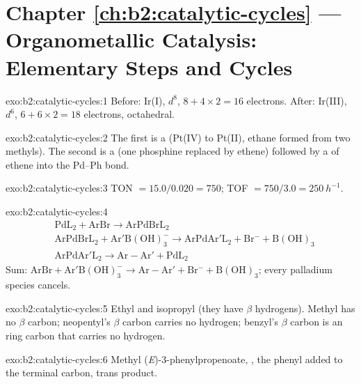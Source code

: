\section*{Chapter \ref{ch:b2:catalytic-cycles} --- Organometallic Catalysis: Elementary Steps and Cycles}

\begin{solution}{exo:b2:catalytic-cycles:1}
Before: Ir(I), $d^8$, $8 + 4 \times 2 = 16$ electrons. After: Ir(III), $d^6$, $6 + 6 \times 2 = 18$
electrons, octahedral.
\end{solution}

\begin{solution}{exo:b2:catalytic-cycles:2}
The first is a  (Pt(IV) to Pt(II), ethane formed from two methyls).
The second is a  (one phosphine replaced by ethene) followed by a
 of ethene into the Pd--Ph bond.
\end{solution}

\begin{solution}{exo:b2:catalytic-cycles:3}
TON $= 15.0/0.020 = 750$; TOF $= 750/3.0 = \qty{250}{h^{-1}}$.
\end{solution}

\begin{solution}{exo:b2:catalytic-cycles:4}
\begin{align*}
  &\mathrm{PdL_2 + ArBr \to ArPdBrL_2}\\
  &\mathrm{ArPdBrL_2 + Ar'B(OH)_3^- \to ArPdAr'L_2 + Br^- + B(OH)_3}\\
  &\mathrm{ArPdAr'L_2 \to Ar{-}Ar' + PdL_2}
\end{align*}
Sum: $\mathrm{ArBr + Ar'B(OH)_3^- \to Ar{-}Ar' + Br^- + B(OH)_3}$; every palladium species
cancels.
\end{solution}

\begin{solution}{exo:b2:catalytic-cycles:5}
Ethyl and isopropyl (they have $\beta$ hydrogens). Methyl has no $\beta$ carbon; neopentyl's $\beta$
carbon carries no hydrogen; benzyl's $\beta$ carbon is an  ring carbon that carries no
hydrogen.
\end{solution}

\begin{solution}{exo:b2:catalytic-cycles:6}
Methyl (\textit{E})-3-phenylpropenoate, , the phenyl added to the
terminal carbon, trans product.
\end{solution}

